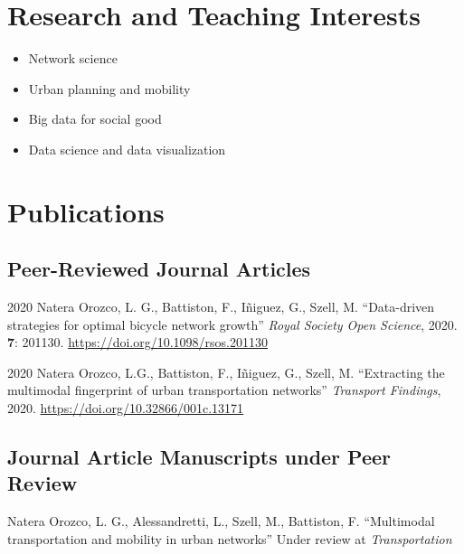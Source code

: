 \documentclass{academiccv}
\begin{document}
\section*{Research and Teaching Interests}
\begin{itemize}
	\item Network science
	\item Urban planning and mobility
	\item Big data for social good
	\item Data science and data visualization
\end{itemize}


\section*{Publications}
\subsection*{Peer-Reviewed Journal Articles}
\begin{tablist}
	\item[2020] \tab Natera Orozco, L. G., Battiston, F., I\~niguez, G., Szell, M. \enquote{Data-driven strategies for optimal bicycle network growth} \textit{Royal Society Open Science}, 2020. \textbf{7}: 201130. \url{https://doi.org/10.1098/rsos.201130}

	\item[2020] \tab Natera Orozco, L.G., Battiston, F., I\~niguez, G., Szell, M. \enquote{Extracting the multimodal fingerprint of urban transportation networks} \textit{Transport Findings}, 2020. \url{https://doi.org/10.32866/001c.13171}
\end{tablist}

\subsection*{Journal Article Manuscripts under Peer Review}
\begin{tablist}
	\item[\the\year] \tab Natera Orozco, L. G., Alessandretti, L., Szell, M., Battiston, F. \enquote{Multimodal transportation and mobility in urban networks} Under review at \textit{Transportation}
\end{tablist}
\end{document}
